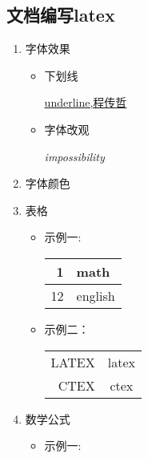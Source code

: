 \documentclass[a4paper, 12pt]{article}
\begin{document}
\subsection{文档编写latex}
\begin{enumerate}
\item{\large 字体效果}
  \begin{itemize}
    \item 下划线
    \begin{center}
        \underline{underline,程传哲}
    \end{center}
    \item 字体改观
    \begin{center}
        \textit{impossibility}
    \end{center}
  \end{itemize}
\item{\large 字体颜色}
\item{\large 表格}
    \begin{itemize}
      \item 示例一:
      \begin{tabular}{|r|l|}
        \hline
        1   & math  \\
        \hline 
        12  & english  \\
        \hline 
      \end{tabular}
      \item 示例二：
      \begin{tabular}{rc|}
      LATEX & latex \\
      \cline{1-1}
      CTEX  & ctex  \\
      \hline
      \end{tabular}
    \end{itemize}
\item {\large 数学公式}
    \begin{itemize}
        \item 示例一:\begin{equation}

\end{equation}
\end{itemize}
\end{enumerate}
\end{document}
